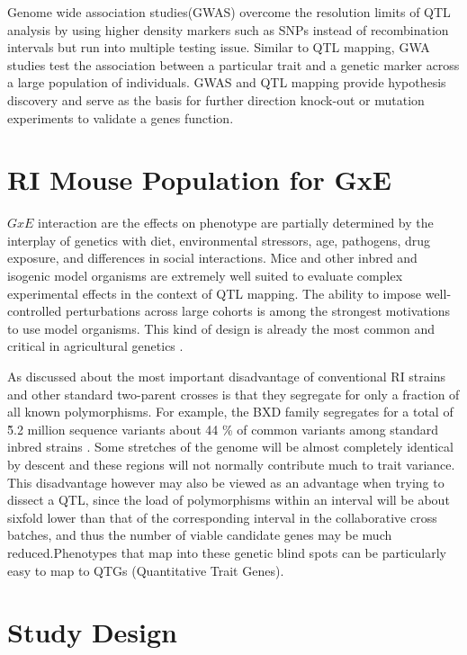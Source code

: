 \documentclass[a4paper]{book}
\begin{document}
		Genome wide association studies(GWAS) overcome the resolution limits of QTL analysis by using higher density markers such as SNPs instead of recombination intervals but run into multiple testing issue. Similar to QTL mapping, GWA studies test the association between a particular trait and a genetic marker across a large population of individuals. GWAS and QTL mapping provide hypothesis discovery and serve as the basis for further direction knock-out or mutation experiments to validate a genes function. 
	
	\section{RI Mouse Population for GxE}
	
	$GxE$ interaction are the effects on phenotype are partially determined by the interplay of genetics with diet, environmental stressors, age, pathogens, drug exposure, and differences in  social interactions. Mice and other inbred and isogenic model organisms are extremely well suited to evaluate complex experimental effects in the context of QTL mapping. The ability to impose well-controlled perturbations across large cohorts is among the strongest motivations to use model organisms. This kind of design is already the most common and critical in agricultural genetics \citep{Pregitzer2013GeneticLinkages.}. 
	
	As discussed about the most important disadvantage of conventional RI strains and other standard two-parent crosses is that they segregate for only a fraction of all known polymorphisms. For example, the BXD family segregates for a total of \~5.2 million sequence variants about 44 \% of common variants among standard inbred strains \citep{Wang2016JointRisk}. Some stretches of the genome will be almost completely identical by descent \citep{Wang2016JointRisk} and these regions will not normally contribute much to trait variance. This disadvantage however may also be viewed as an advantage when trying to dissect a QTL, since the load of polymorphisms within an interval will be about sixfold lower than that of the corresponding interval in the collaborative cross batches, and thus the number of viable candidate genes may be much reduced.Phenotypes that map into these genetic blind spots can be particularly easy to map to QTGs (Quantitative Trait Genes)\citep{Mackay2009TheProspects}. 
	
	\section{Study Design}
	
\end{document}

